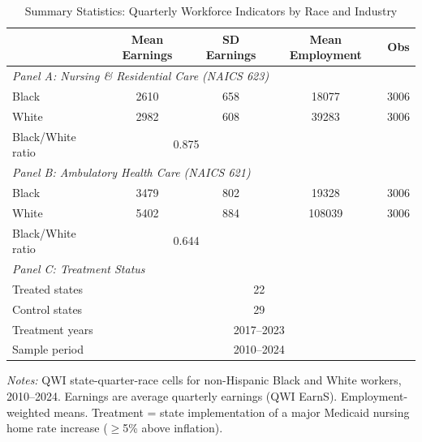 
\begin{table}[t]
\centering
\caption{Summary Statistics: Quarterly Workforce Indicators by Race and Industry}
\label{tab:summary}
\begin{threeparttable}
\begin{tabular}{lcccc}
\toprule
 & Mean Earnings & SD Earnings & Mean Employment & Obs \\
\midrule
\multicolumn{5}{l}{\textit{Panel A: Nursing \& Residential Care (NAICS 623)}} \\[3pt]
Black  & 2610 & 658 & 18077 & 3006 \\
White  & 2982 & 608 & 39283 & 3006 \\
Black/White ratio & \multicolumn{2}{c}{0.875} & & \\[6pt]
\multicolumn{5}{l}{\textit{Panel B: Ambulatory Health Care (NAICS 621)}} \\[3pt]
Black  & 3479 & 802 & 19328 & 3006 \\
White  & 5402 & 884 & 108039 & 3006 \\
Black/White ratio & \multicolumn{2}{c}{0.644} & & \\[6pt]
\multicolumn{5}{l}{\textit{Panel C: Treatment Status}} \\[3pt]
Treated states   & \multicolumn{4}{c}{22} \\
Control states   & \multicolumn{4}{c}{29} \\
Treatment years  & \multicolumn{4}{c}{2017--2023} \\
Sample period    & \multicolumn{4}{c}{2010--2024} \\
\bottomrule
\end{tabular}
\begin{tablenotes}[flushleft]
\small
\item \textit{Notes:} QWI state-quarter-race cells for non-Hispanic Black and White workers, 2010--2024.
Earnings are average quarterly earnings (QWI EarnS). Employment-weighted means.
Treatment = state implementation of a major Medicaid nursing home rate increase ($\geq$5\% above inflation).
\end{tablenotes}
\end{threeparttable}
\end{table}

